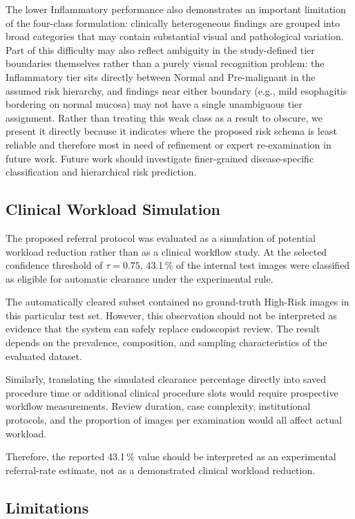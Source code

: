\documentclass[11pt,a4paper]{article}
\begin{document}
The lower Inflammatory performance also demonstrates an important limitation
of the four-class formulation: clinically heterogeneous findings are grouped
into broad categories that may contain substantial visual and pathological
variation. Part of this difficulty may also reflect ambiguity in the
study-defined tier boundaries themselves rather than a purely visual
recognition problem: the Inflammatory tier sits directly between Normal and
Pre-malignant in the assumed risk hierarchy, and findings near either
boundary (e.g., mild esophagitis bordering on normal mucosa) may not have a
single unambiguous tier assignment. Rather than treating this weak class as
a result to obscure, we present it directly because it indicates where the
proposed risk schema is least reliable and therefore most in need of
refinement or expert re-examination in future work. Future work should
investigate finer-grained disease-specific classification and hierarchical
risk prediction.

\subsection{Clinical Workload Simulation}

The proposed referral protocol was evaluated as a simulation of potential
workload reduction rather than as a clinical workflow study. At the selected
confidence threshold of $\tau=0.75$, 43.1\,\% of the internal test images
were classified as eligible for automatic clearance under the experimental
rule.

The automatically cleared subset contained no ground-truth High-Risk images
in this particular test set. However, this observation should not be
interpreted as evidence that the system can safely replace endoscopist review.
The result depends on the prevalence, composition, and sampling
characteristics of the evaluated dataset.

Similarly, translating the simulated clearance percentage directly into saved
procedure time or additional clinical procedure slots would require prospective
workflow measurements. Review duration, case complexity, institutional
protocols, and the proportion of images per examination would all affect
actual workload.

Therefore, the reported 43.1\,\% value should be interpreted as an
experimental referral-rate estimate, not as a demonstrated clinical
workload reduction.

\subsection{Limitations}
\label{sec:limitations}
\end{document}
